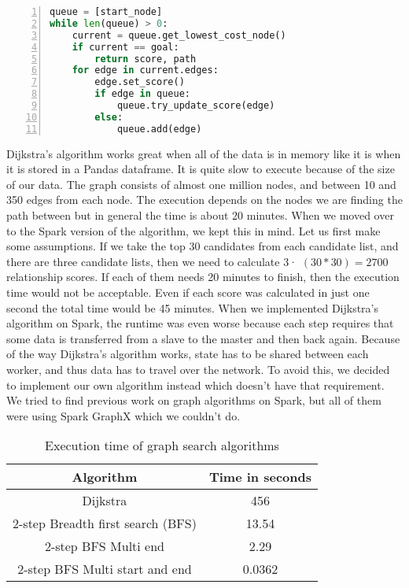 \begin{lstlisting}[float=h, language=Python, caption=Dijkstra pseudocode, label=CodeDijkstra, numbers=left]
queue = [start_node]
while len(queue) > 0:
    current = queue.get_lowest_cost_node()
    if current == goal:
        return score, path
    for edge in current.edges:
        edge.set_score()
        if edge in queue:
            queue.try_update_score(edge)
        else:
            queue.add(edge)
\end{lstlisting}



Dijkstra's algorithm works great when all of the data is in memory like it is when it is stored in a Pandas dataframe. It is quite slow to execute because of the size of our data. The graph consists of almost one million nodes, and between 10 and 350 edges from each node. The execution depends on the nodes we are finding the path between but in general the time is about 20 minutes. When we moved over to the Spark version of the algorithm, we kept this in mind. Let us first make some assumptions. If we take the top 30 candidates from each candidate list, and there are three candidate lists, then we need to calculate 3· $(30*30)=2700$ relationship scores. If each of them needs 20 minutes to finish, then the execution time would not be acceptable. Even if each score was calculated in just one second the total time would be 45 minutes. When we implemented Dijkstra's algorithm on Spark, the runtime was even worse because each step requires that some data is transferred from a slave to the master and then back again. Because of the way Dijkstra's algorithm works, state has to be shared between each worker, and thus data has to travel over the network. To avoid this, we decided to implement our own algorithm instead which doesn’t have that requirement. We tried to find previous work on graph algorithms on Spark, but all of them were using Spark GraphX which we couldn’t do.

\begin{table}[h]
    \centering
        \begin{tabular}{ |c|c| } 
            \hline
            \textbf{Algorithm} & \textbf{Time in seconds} \\ 
            \hline
            Dijkstra & 456 \\ 
            2-step Breadth first search (BFS) & 13.54 \\ 
            2-step BFS Multi end & 2.29 \\ 
            2-step BFS Multi start and end & 0.0362 \\
            \hline
        \end{tabular}
        \caption{Execution time of graph search algorithms}
        \label{SearchAlgorithmTable}
\end{table}

